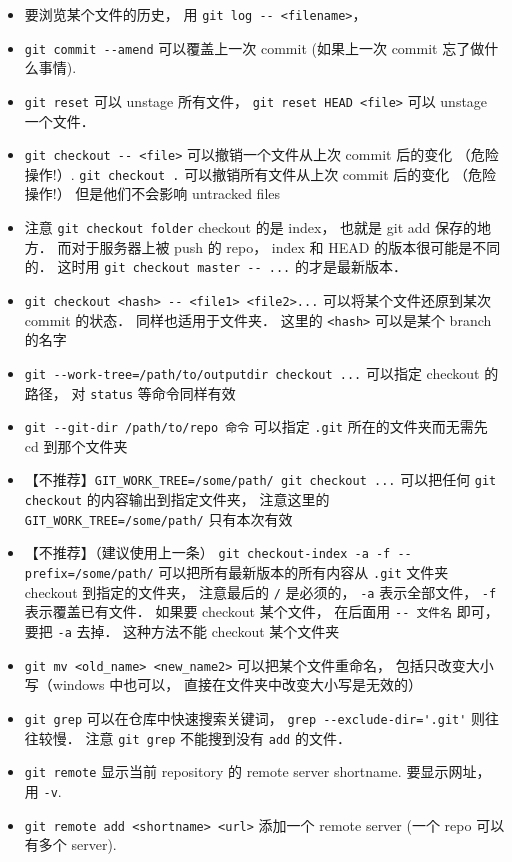 \begin{itemize}
\item 要浏览某个文件的历史， 用 \verb|git log -- <filename>|， 
\item \verb|git commit --amend| 可以覆盖上一次 commit (如果上一次 commit 忘了做什么事情).
\item \verb|git reset| 可以 unstage 所有文件， \verb|git reset HEAD <file>| 可以 unstage 一个文件．
\item \verb|git checkout -- <file>| 可以撤销一个文件从上次 commit 后的变化 （危险操作!）. \verb|git checkout .| 可以撤销所有文件从上次 commit 后的变化 （危险操作!） 但是他们不会影响 untracked files
\item 注意 \verb|git checkout folder| checkout 的是 index， 也就是 git add 保存的地方． 而对于服务器上被 push 的 repo， index 和 HEAD 的版本很可能是不同的． 这时用 \verb|git checkout master -- ...| 的才是最新版本．
\item \verb|git checkout <hash> -- <file1> <file2>...| 可以将某个文件还原到某次 commit 的状态． 同样也适用于文件夹． 这里的 \verb|<hash>| 可以是某个 branch 的名字
\item \verb|git --work-tree=/path/to/outputdir checkout ...| 可以指定 checkout 的路径， 对 \verb|status| 等命令同样有效
\item \verb|git --git-dir /path/to/repo 命令| 可以指定 \verb|.git| 所在的文件夹而无需先 cd 到那个文件夹
\item 【不推荐】\verb|GIT_WORK_TREE=/some/path/ git checkout ...| 可以把任何 \verb|git checkout| 的内容输出到指定文件夹， 注意这里的 \verb|GIT_WORK_TREE=/some/path/| 只有本次有效
\item 【不推荐】（建议使用上一条） \verb|git checkout-index -a -f --prefix=/some/path/| 可以把所有最新版本的所有内容从 \verb|.git| 文件夹 checkout 到指定的文件夹， 注意最后的 \verb|/| 是必须的， \verb|-a| 表示全部文件， \verb|-f| 表示覆盖已有文件． 如果要 checkout 某个文件， 在后面用 \verb|-- 文件名| 即可， 要把 \verb|-a| 去掉． 这种方法不能 checkout 某个文件夹
\item \verb|git mv <old_name> <new_name2>| 可以把某个文件重命名， 包括只改变大小写（windows 中也可以， 直接在文件夹中改变大小写是无效的）
\item \verb|git grep| 可以在仓库中快速搜索关键词， \verb|grep --exclude-dir='.git'| 则往往较慢． 注意 \verb|git grep| 不能搜到没有 \verb|add| 的文件．
\item \verb|git remote| 显示当前 repository 的 remote server shortname. 要显示网址， 用 \verb|-v|.
\item \verb|git remote add <shortname> <url>| 添加一个 remote server (一个 repo 可以有多个 server).

\end{itemize}
